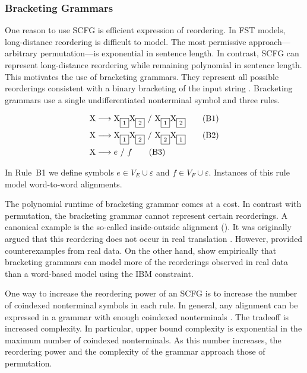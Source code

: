 \subsubsection{Bracketing Grammars}\label{sec:bracketing-transduction-grammar}

One reason to use SCFG is efficient expression of reordering.
In FST models, long-distance reordering is difficult to model.  The
most permissive approach---arbitrary permutation---is exponential in 
sentence length.  In contrast, SCFG can represent long-distance
reordering while remaining polynomial in sentence length.
This motivates the use of bracketing grammars.  They
represent all possible reorderings
consistent with a binary bracketing of the input string 
\citep{Wu:1996:acl}.  Bracketing grammars use
a single undifferentiated nonterminal symbol and
three rules.

\begin{align}
\X & \longrightarrow \cidx{\X}{1} \cidx{\X}{2} ~/~ \cidx{\X}{1}\cidx{\X}{2} \tag{B1} \\
\X & \longrightarrow \cidx{\X}{1} \cidx{\X}{2} ~/~ \cidx{\X}{2}\cidx{\X}{1} \tag{B2} \\
\X & \longrightarrow e ~/~ f \tag{B3}
\end{align}

\noindent In Rule~B1 we define symbols 
$e \in V_E \cup \varepsilon$ and $f \in V_F \cup \varepsilon$.
Instances of this rule model word-to-word alignments.

The polynomial runtime of bracketing grammar comes at a cost.
In contrast with permutation, the bracketing grammar
cannot represent certain reorderings.
A canonical example is the so-called
inside-outside alignment ().
It was originally argued that this reordering does not occur in 
real translation \citep{Wu:1995:tmi}.  However, \citet{Wellington:2006:acl-coling}
provided counterexamples from real data.  On the other hand,
\citet{Zens:2003:acl} show empirically that
bracketing grammars can model more of the
reorderings observed in real data than a 
word-based model using the IBM constraint.

One way to increase the reordering power of an SCFG is to
increase the number of coindexed nonterminal symbols in each rule.
In general, any alignment can
be expressed in a grammar with enough coindexed
nonterminals \citep{Aho:1969:css}.  The tradeoff 
is increased complexity.  In particular, upper bound
complexity is exponential in the maximum
number of coindexed nonterminals.  As this number increases,
the reordering power and the complexity of the grammar
approach those of permutation.

